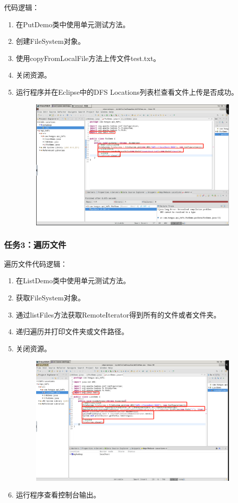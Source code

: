 \documentclass {article}
\begin{document}
				代码逻辑：
				\begin{enumerate}
					\item 在PutDemo类中使用单元测试方法。
					\item 创建FileSystem对象。
					\item 使用copyFromLocalFile方法上传文件test.txt。
					\item 关闭资源。
					\item 运行程序并在Eclipse中的DFS Locations列表栏查看文件上传是否成功。
					\begin{figure}[H]
						\centering
						\includegraphics[width=4in]{figures/fig20.png}
					\end{figure}
				\end{enumerate}
			
			\subsubsection{任务3：遍历文件}
				遍历文件代码逻辑：
				\begin{enumerate}
					\item 在ListDemo类中使用单元测试方法。
					\item 获取FileSystem对象。
					\item 通过listFiles方法获取RemoteIterator得到所有的文件或者文件夹。
					\item 递归遍历并打印文件夹或文件路径。
					\item 关闭资源。
					\begin{figure}[H]
						\centering
						\includegraphics[width=4in]{figures/fig20.5.jpg}
					\end{figure}
					\item 运行程序查看控制台输出。
				\end{enumerate}
			
\end{document}
